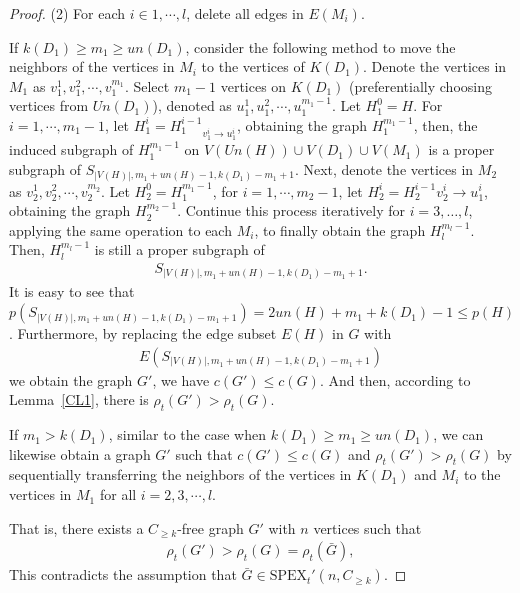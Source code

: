 \documentclass[preprint,12pt]{elsarticle}
\begin{document}
\begin{proof}
            \noindent (2) For each $i \in {1, \cdots, l}$, delete all edges in $E(M_i)$.


            If $k(D_1) \geq m_1 \geq un(D_1)$, consider the following method to move the neighbors of the vertices in $M_i$ to the vertices of $K(D_1)$. Denote the vertices in $M_1$ as $v_1^1, v_1^2, \cdots, v_1^{m_1}$.
            Select $m_1 - 1$ vertices on $K(D_1)$ (preferentially choosing vertices from $Un(D_1)$), denoted as $u_1^1, u_1^2, \cdots, u_1^{m_1 - 1}$. Let $H_1^0 = H$. For $i = 1, \cdots, m_1 - 1$, let $H_1^i = {H_1^{i-1}}_{v_1^i \to u_1^i}$, obtaining the graph $H_1^{m_1 - 1}$, then, the induced subgraph of $H_1^{m_1 - 1}$ on $V(Un(H)) \cup V(D_1) \cup V(M_1)$ is a proper subgraph of $S_{|V(H)|, m_1+un(H)-1, k(D_1) - m_1 + 1}$.
            Next, denote the vertices in $M_2$ as $v_2^1, v_2^2, \cdots, v_2^{m_2}$. Let $H_2^0 = H_1^{m_1 - 1}$, for $i = 1, \cdots, m_2 - 1$, let $H_2^i = {H_2^{i-1}}{v_2^i \to u_1^i}$, obtaining the graph $H_2^{m_2 - 1}$.
            Continue this process iteratively for $i = 3, \ldots, l$, applying the same operation to each $M_i$, to finally obtain the graph $H_l^{m_l - 1}$.
            Then, $H_l^{m_l - 1}$ is still a proper subgraph of
                \begin{align*}
                        S_{|V(H)|, m_1+un(H)-1, k(D_1) - m_1 + 1}.
                \end{align*}
            It is easy to see that $p(S_{|V(H)|, m_1+un(H)-1, k(D_1) - m_1 + 1}) = 2un(H)+m_1+k(D_1)-1 \leq p(H)$.
            Furthermore, by replacing the edge subset $E(H)$ in $G$ with
                \begin{align*}
                        E(S_{|V(H)|, m_1+un(H)-1, k(D_1) - m_1 + 1})
                \end{align*}
            we obtain the graph $G'$, we have $c(G') \leq c(G)$. And then, according to Lemma~\ref{CL1}, there is $\rho_t(G') > \rho_t(G)$.


            If $m_1 > k(D_1)$, similar to the case when $k(D_1) \geq m_1 \geq un(D_1)$, we can likewise obtain a graph $G'$ such that $c(G') \leq c(G)$ and $\rho_t(G') > \rho_t(G)$ by sequentially transferring the neighbors of the vertices in $K(D_1)$ and $M_i$ to the vertices in $M_1$ for all $i = {2, 3, \cdots, l}$.



            That is, there exists a $C_{\geq k}$-free graph $G'$ with $n$ vertices such that
                    \begin{align*}
                        \rho_t(G')>\rho_t(G) = \rho_t(\bar{G}),
                    \end{align*}
            This contradicts the assumption that $\bar{G}\in \mathrm{SPEX}_t'(n,C_{\geq k})$.


        \end{proof}
\end{document}
